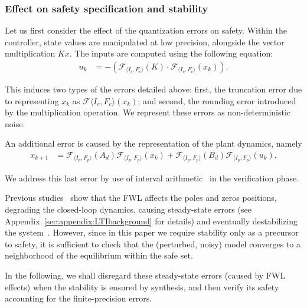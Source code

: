 \documentclass[runningheads,a4paper]{llncs}
\begin{document}
\subsubsection{Effect on safety specification and stability}

Let us first consider the effect of the quantization errors on safety. 
Within the controller, state values are manipulated at low precision,
alongside the vector multiplication $Kx$.
%
The inputs are computed using the following equation: 
%
\begin{align*}
u_{k}&=-(\mathcal{F}_{\langle I_c,F_c \rangle}(K)\cdot\mathcal{F}_{\langle I_c,F_c \rangle}(x_{k})). 
\end{align*}

This induces two types of the errors detailed above: first, the truncation
error due to representing $x_k$ as $\mathcal{F}{\langle I_c,F_c
\rangle}(x_{k})$; and second, the rounding error introduced by the
multiplication operation.  We represent these errors as non-deterministic
noise.

An additional error is caused by the representation of the plant dynamics, namely 
%
\begin{align*}
x_{k+1} &=\mathcal{F}_{\langle I_p,F_p \rangle}(A_d) \mathcal{F}_{\langle I_p,F_p \rangle}(x_{k}) + \mathcal{F}_{\langle I_p,F_p \rangle}(B_d)\mathcal{F}_{\langle I_p,F_p \rangle}(u_{k}).
\end{align*}

We address this last error by use of interval
arithmetic~\cite{moore1966interval} in the verification phase.

Previous studies~\cite{gangli1} show that the FWL affects the poles and
zeros positions, degrading the closed-loop dynamics, causing steady-state
errors (see Appendix~\ref{sec:appendix:LTIbackground} for details) and
eventually destabilizing the system~\cite{Bessa16}.  However, since in this
paper we require stability only as a precursor to safety, it is sufficient
to check that the (perturbed, noisy) model converges to a neighborhood of
the equilibrium within the safe set.

In the following, we shall disregard these steady-state errors (caused by
FWL effects) when the stability is ensured by synthesis, and then verify its
safety accounting for the finite-precision errors.

\end{document}
